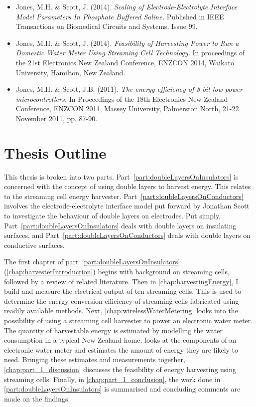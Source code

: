  \begin{itemize}
    \item Jones, M.H. \& Scott, J. (2014). \emph{Scaling of Electrode-Electrolyte Interface Model Parameters In Phosphate Buffered Saline.} Published in IEEE Transactions on Biomedical Circuits and Systems, Issue 99.
    \item Jones, M.H. \& Scott, J. (2014). \emph{Feasibility of Harvesting Power to Run a Domestic Water Meter Using Streaming Cell Technology.} In proceedings of the 21st Electronics New Zealand Conference, ENZCON 2014, Waikato University, Hamilton, New Zealand.
    \item Jones, M.H. \& Scott, J.B. (2011). \emph{The energy efficiency of 8-bit low-power microcontrollers.} In Proceedings of the 18th Electronics New Zealand Conference, ENZCON 2011, Massey University, Palmerston North, 21-22 November 2011, pp. 87-90.
  \end{itemize}

\section{Thesis Outline}

  This thesis is broken into two parts.
  Part~\ref{part:doubleLayersOnInsulators} is concerned with the concept of using double layers to harvest energy.
  This relates to the streaming cell energy harvester.
  Part~\ref{part:doubleLayersOnConductors} involves the electrode-electrolyte interface model put forward by Jonathan Scott to investigate the behaviour of double layers on electrodes.
  Put simply, Part~\ref{part:doubleLayersOnInsulators} deals with double layers on insulating surfaces, and Part~\ref{part:doubleLayersOnConductors} deals with double layers on conductive surfaces.

  The first chapter of part~\ref{part:doubleLayersOnInsulators} (\cref{chap:harvesterIntroduction}) begins with background on streaming cells, followed by a review of related literature.
  Then in \cref{chap:harvestingEnergy}, I build and measure the electrical output of ten streaming cells.
  This is used to determine the energy conversion efficiency of streaming cells fabricated using readily available methods.
  Next, \cref{chap:wirelessWaterMetering} looks into the possibility of using a streaming cell harvester to power an electronic water meter.
  The quantity of harvestable energy is estimated by modelling the water consumption in a typical New Zealand home.
   looks at the components of an electronic water meter and estimates the amount of energy they are likely to need.
  Bringing these estimates and measurements together, \cref{chap:part_1_discussion} discusses the feasibility of energy harvesting using streaming cells.
  Finally, in \cref{chap:part_1_conclusion}, the work done in \cref{part:doubleLayersOnInsulators} is summarised and concluding comments are made on the findings.


